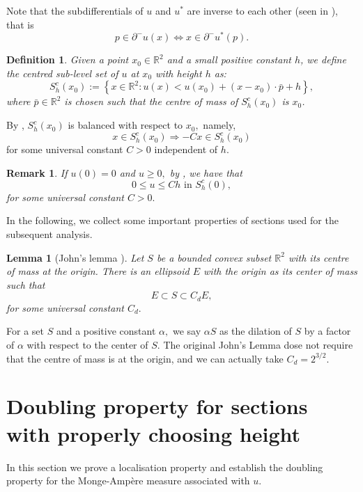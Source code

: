 \documentclass[11pt]{amsart}
\theoremstyle{plain}
\newtheorem{lemma}{Lemma}[section]
\newtheorem{definition}{Definition}[section]
\newtheorem{remark}{Remark}[section]
\newcommand{\R}{\mathbb{R}}
\newcommand{\0}{\textbf{0}}
\numberwithin{equation}{section}
\numberwithin{equation}{section}
\numberwithin{figure}{section}
\begin{document}
	Note that the subdifferentials of $u$ and $u^{*}$ are inverse to each other (seen in \cite{R}), that is
	\begin{equation}\label{eq}
		p\in \partial^{-}u(x)\Leftrightarrow x\in \partial^{-}u^*(p).
	\end{equation}
	
	\begin{definition}
		Given a point $x_0\in \mathbb{R}^2$ and a small positive constant $h$, we define the centred sub-level set of $u$ at $x_0$ with height $h$ as:
		\begin{equation}\label{sect}
			S^c_{h}(x_0) := \left\{x\in\mathbb{R}^2 : u(x)< u(x_0) + (x-x_0)\cdot \bar{p} + h\right\},
		\end{equation}
		where $\bar{p}\in \mathbb{R}^2$ is chosen such that the centre of mass of $S^c_{h}(x_0)$ is $x_0$. 
	\end{definition}
	By \cite[Lemma 2.1]{C96}, $S^c_h(x_0)$ is balanced with respect to $x_0,$ namely,
	$$x\in S^c_h(x_0) \Longrightarrow -Cx\in S^c_h(x_0)$$
	for some universal constant $C>0$ independent of $h.$
	\begin{remark}\label{center bound}
		If $u(0)=0$ and $u\geq 0,$ by \cite[Remark 2.2]{CLW3}, we have that $$0\leq u\leq Ch \text{  in   }S^c_h(0),$$
		for some universal constant $C>0.$ 
	\end{remark}
	In the following, we collect some important properties of sections used for the subsequent analysis. 
	\begin{lemma}[John's lemma \cite{J}]\label{John'sLemma}
		Let $S$ be a bounded convex subset $\R^2$ with its centre of mass at the origin. There is an ellipsoid $E$ with the origin as its center of mass such that $$E\subset S\subset  C_d E,$$ for some universal constant $C_d.$ 
	\end{lemma}
	For a set $S$ and a positive constant $\alpha,$ we say $\alpha S$ as the dilation of $S$ by a factor of $\alpha$ with respect to the center of $S.$ The original John's Lemma dose not require that the centre of mass is at the origin, and we can actually take $C_d=2^{3/2}.$ 
	
	
	
	\section{Doubling property for sections with properly choosing height}\label{S3}
	
	In this section we prove a localisation property and establish the doubling property for the Monge-Amp\`{e}re measure associated with $u.$
	
\end{document}

